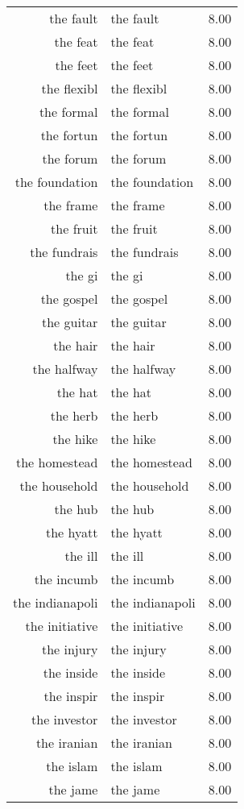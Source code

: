 \begin{table}[ht]
\begin{tabular}{rlr}
  the fault & the fault & 8.00 \\ 
  the feat & the feat & 8.00 \\ 
  the feet & the feet & 8.00 \\ 
  the flexibl & the flexibl & 8.00 \\ 
  the formal & the formal & 8.00 \\ 
  the fortun & the fortun & 8.00 \\ 
  the forum & the forum & 8.00 \\ 
  the foundation & the foundation & 8.00 \\ 
  the frame & the frame & 8.00 \\ 
  the fruit & the fruit & 8.00 \\ 
  the fundrais & the fundrais & 8.00 \\ 
  the gi & the gi & 8.00 \\ 
  the gospel & the gospel & 8.00 \\ 
  the guitar & the guitar & 8.00 \\ 
  the hair & the hair & 8.00 \\ 
  the halfway & the halfway & 8.00 \\ 
  the hat & the hat & 8.00 \\ 
  the herb & the herb & 8.00 \\ 
  the hike & the hike & 8.00 \\ 
  the homestead & the homestead & 8.00 \\ 
  the household & the household & 8.00 \\ 
  the hub & the hub & 8.00 \\ 
  the hyatt & the hyatt & 8.00 \\ 
  the ill & the ill & 8.00 \\ 
  the incumb & the incumb & 8.00 \\ 
  the indianapoli & the indianapoli & 8.00 \\ 
  the initiative & the initiative & 8.00 \\ 
  the injury & the injury & 8.00 \\ 
  the inside & the inside & 8.00 \\ 
  the inspir & the inspir & 8.00 \\ 
  the investor & the investor & 8.00 \\ 
  the iranian & the iranian & 8.00 \\ 
  the islam & the islam & 8.00 \\ 
  the jame & the jame & 8.00 \\ 

\end{tabular}
\end{table}

